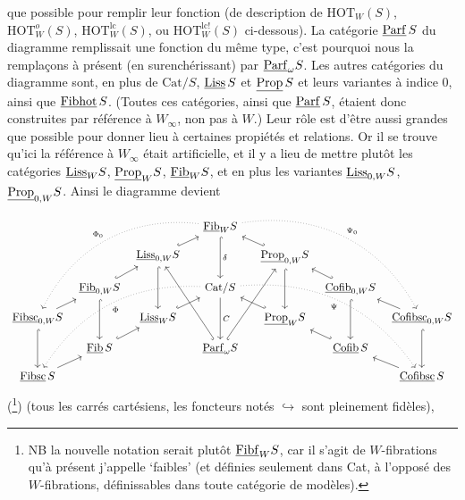 que possible pour remplir leur fonction (de description de $\mathrm{HOT}_W(S)$, $\mathrm{HOT}^{o}_W(S)$, $\mathrm{HOT}^{\mathrm{lc}}_W(S)$, ou $\mathrm{HOT}^{\mathrm{lc}!}_W(S)$ ci-dessous). La catégorie $\underline{\mathrm{Parf}}\,S$ du diagramme remplissait une fonction du même type, c'est pourquoi nous la remplaçons à présent (en surenchérissant) par $\underline{\mathrm{Parf}}_\omega S$. Les autres catégories du diagramme sont, en plus de $\mathrm{Cat}/S$, $\underline{\mathrm{Liss}}\,S$ et $\underline{\mathrm{Prop}}\,S$ et leurs variantes à indice 0, ainsi que $\underline{\mathrm{Fibhot}}\,S$. (Toutes ces catégories, ainsi que $\underline{\mathrm{Parf}}\,S$, étaient donc construites par référence à $W_\infty$, non pas à $W$.) Leur rôle est d'être aussi grandes que possible pour donner lieu à certaines propiétés et relations. Or il se trouve qu'ici la référence à $W_\infty$ était artificielle, et il y a lieu de mettre plutôt les catégories $\underline{\mathrm{Liss}}_W S$, $\underline{\mathrm{Prop}}_W S$, $\underline{\mathrm{Fib}}_W S$, et en plus les variantes $\underline{\mathrm{Liss}}_{0,W} S$, $\underline{\mathrm{Prop}}_{0,W} S$. Ainsi le diagramme devient %
\[
\begin{tikzcd}[column sep=tiny, row sep=small]
 & & & & \ul{Fib}_W S \arrow[dd, hook, "\delta"] \arrow[dddllll, dotted, bend right=35, "\Phi_0"'] \arrow[dddrrrr, dotted, bend left=35, "\Psi_0"] & & & & \\
 & & \ul{Liss}_{0,W} S \arrow[urr, hook] \arrow[dd, hook] & & & & \ul{Prop}_{0,W} S \arrow[ull, hook'] \arrow[dd, hook] & & \\
 & \ul{Fib}_{0,W} S \arrow[ur, hook] \arrow[dd, hook] & & & \mathrm{Cat}/S \arrow[dd, "C"] \arrow[dddllll, dotted, bend right=30, "\Phi"] \arrow[dddrrrr, dotted, bend left=30, "\Psi"'] & & & \ul{Cofib}_{0,W} S \arrow[ul, hook'] \arrow[dd, hook] & \\
\ul{Fibsc}_{0,W} S \arrow[ur] \arrow[dd, hook] & & \ul{Liss}_W S \arrow[urr, hook] & & & & \ul{Prop}_W S \arrow[ull, hook'] & & \ul{Cofibsc}_{0,W} S \arrow[ul] \arrow[dd, hook] \\
 & \ul{Fib}\,S \arrow[ur, hook] & & & \ul{Parf}_\omega S \arrow[uuull, hook] \arrow[uuurr, hook'] & & & \ul{Cofib}\,S \arrow[ul, hook'] & \\
\ul{Fibsc}\,S \arrow[ur] & & & & & & & & \ul{Cofibsc}\,S \arrow[ul]
\end{tikzcd}
\]
(\footnote{NB la nouvelle notation serait plutôt $\underline{\mathrm{Fibf}}_W S$, car il s'agit de $W$-fibrations qu'à présent j'appelle `faibles' (et définies seulement dans Cat, à l'opposé des $W$-fibrations, définissables dans toute catégorie de modèles).}) (tous les carrés cartésiens, les foncteurs notés $\hookrightarrow$ sont pleinement fidèles),

